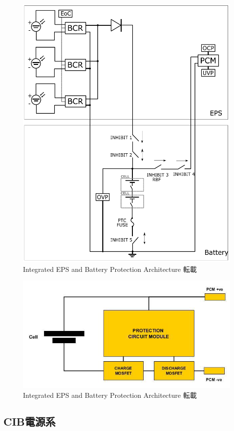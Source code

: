 \begin{figure}[htbp]
	\begin{center}
		\includegraphics[width=0.5\linewidth]{./03/fig/bat_protection.png}
		\caption{Integrated EPS and Battery Protection Architecture 転載}
		\label{mir}
	\end{center}
\end{figure}

\begin{figure}[htbp]
	\begin{center}
		\includegraphics[width=0.5\linewidth]{./03/fig/cell_protection.png}
		\caption{Integrated EPS and Battery Protection Architecture 転載}
		\label{cell_p}
	\end{center}
\end{figure}


\subsection{CIB電源系}

